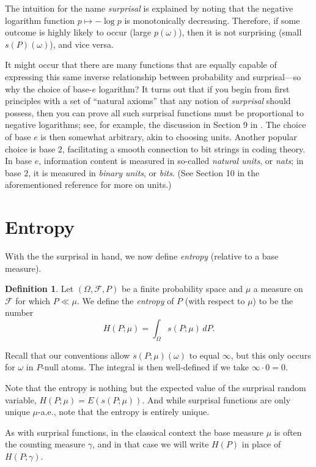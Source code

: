 \documentclass[11pt]{book}
\theoremstyle{definition}
\newtheorem{defn}[thm]{Definition}
\numberwithin{equation}{section}
\begin{document}
The intuition for the name \textit{surprisal} is explained by noting that the negative logarithm function $p \mapsto -\log{p}$ is monotonically decreasing. Therefore, if some outcome is highly likely to occur (large $p(\omega)$), then it is not surprising (small
$s(P)(\omega)$), and vice versa.

It might occur that there are many functions that are equally capable of expressing this same inverse relationship between probability and surprisal—so why the choice of base-$e$ logarithm? It turns out that if you begin from first principles with a set of ``natural axioms'' that any notion of \textit{surprisal} should possess, then you can prove all such surprisal functions must be proportional to negative logarithms; see, for example, the discussion in Section 9 in \cite{Rioul2021}. The choice of base $e$ is then somewhat arbitrary, akin to choosing units. Another popular choice is base $2$, facilitating a smooth connection to bit strings in coding theory. In base $e$, information content is measured in so-called \textit{natural units}, or \textit{nats}; in base $2$, it is measured in \textit{binary units}, or \textit{bits}. (See Section 10 in the aforementioned reference \cite{Rioul2021} for more on units.)


\section{Entropy}

With the the surprisal in hand, we now define \textit{entropy} (relative to a base measure).

\begin{defn}
	Let $(\Omega,\mathcal{F},P)$ be a finite probability space and $\mu$ a measure on $\mathcal{F}$ for which $P \ll \mu$. We define the \textit{entropy} of $P$ (with respect to $\mu$) to be the number
	\[
		H(P;\mu) = \int_\Omega s(P;\mu) \, dP.
	\]
\end{defn}

Recall that our conventions allow $s(P;\mu)(\omega)$ to equal $\infty$, but this only occurs for $\omega$ in $P$-null atoms. The integral is then well-defined if we take $\infty \cdot 0 =0$.

Note that the entropy is nothing but the expected value of the surprisal random variable, $H(P;\mu) = E\left(s(P;\mu)\right)$. And while surprisal functions are only unique $\mu$-a.e., note that the entropy is entirely unique.

As with surprisal functions, in the classical context the base measure $\mu$ is often the counting measure $\gamma$, and in that case we will write $H(P)$ in place of $H(P;\gamma)$.
\end{document}
